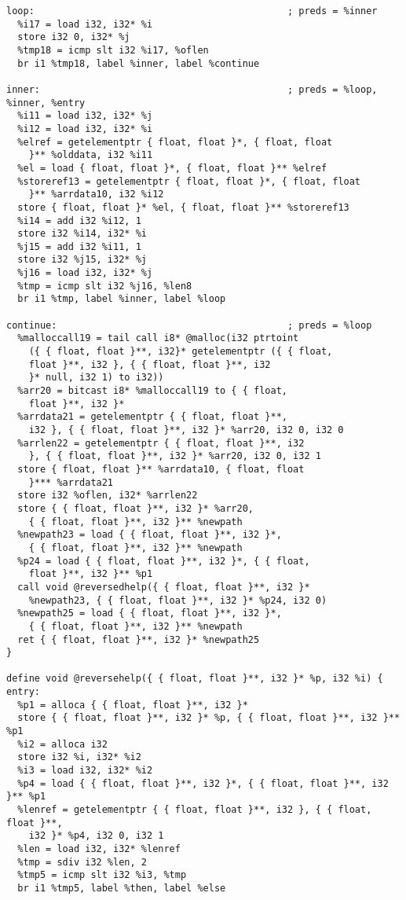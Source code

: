 \documentclass[main.tex]{subfiles}
\begin{document}
{\begin{lstlisting}
loop:                                             ; preds = %inner
  %i17 = load i32, i32* %i
  store i32 0, i32* %j
  %tmp18 = icmp slt i32 %i17, %oflen
  br i1 %tmp18, label %inner, label %continue

inner:                                            ; preds = %loop, %inner, %entry
  %i11 = load i32, i32* %j
  %i12 = load i32, i32* %i
  %elref = getelementptr { float, float }*, { float, float 
    }** %olddata, i32 %i11
  %el = load { float, float }*, { float, float }** %elref
  %storeref13 = getelementptr { float, float }*, { float, float
    }** %arrdata10, i32 %i12
  store { float, float }* %el, { float, float }** %storeref13
  %i14 = add i32 %i12, 1
  store i32 %i14, i32* %i
  %j15 = add i32 %i11, 1
  store i32 %j15, i32* %j
  %j16 = load i32, i32* %j
  %tmp = icmp slt i32 %j16, %len8
  br i1 %tmp, label %inner, label %loop

continue:                                         ; preds = %loop
  %malloccall19 = tail call i8* @malloc(i32 ptrtoint 
    ({ { float, float }**, i32}* getelementptr ({ { float,
    float }**, i32 }, { { float, float }**, i32 
    }* null, i32 1) to i32))
  %arr20 = bitcast i8* %malloccall19 to { { float,
    float }**, i32 }*
  %arrdata21 = getelementptr { { float, float }**,
    i32 }, { { float, float }**, i32 }* %arr20, i32 0, i32 0
  %arrlen22 = getelementptr { { float, float }**, i32 
    }, { { float, float }**, i32 }* %arr20, i32 0, i32 1
  store { float, float }** %arrdata10, { float, float
    }*** %arrdata21
  store i32 %oflen, i32* %arrlen22
  store { { float, float }**, i32 }* %arr20, 
    { { float, float }**, i32 }** %newpath
  %newpath23 = load { { float, float }**, i32 }*,
    { { float, float }**, i32 }** %newpath
  %p24 = load { { float, float }**, i32 }*, { { float,
    float }**, i32 }** %p1
  call void @reversedhelp({ { float, float }**, i32 }*
    %newpath23, { { float, float }**, i32 }* %p24, i32 0)
  %newpath25 = load { { float, float }**, i32 }*, 
    { { float, float }**, i32 }** %newpath
  ret { { float, float }**, i32 }* %newpath25
}

define void @reversehelp({ { float, float }**, i32 }* %p, i32 %i) {
entry:
  %p1 = alloca { { float, float }**, i32 }*
  store { { float, float }**, i32 }* %p, { { float, float }**, i32 }** %p1
  %i2 = alloca i32
  store i32 %i, i32* %i2
  %i3 = load i32, i32* %i2
  %p4 = load { { float, float }**, i32 }*, { { float, float }**, i32 }** %p1
  %lenref = getelementptr { { float, float }**, i32 }, { { float, float }**, 
    i32 }* %p4, i32 0, i32 1
  %len = load i32, i32* %lenref
  %tmp = sdiv i32 %len, 2
  %tmp5 = icmp slt i32 %i3, %tmp
  br i1 %tmp5, label %then, label %else


\end{lstlisting}}
\end{document}
